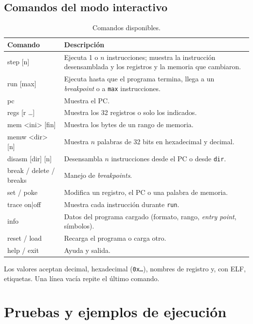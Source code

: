\documentclass[11pt,a4paper]{article}
\begin{document}
\subsection{Comandos del modo interactivo}

\begin{table}[h]
  \centering
  \caption{Comandos disponibles.}
  \small
  \begin{tabularx}{\textwidth}{>{\ttfamily}l X}
    \toprule
    \textbf{Comando} & \textbf{Descripción} \\
    \midrule
    step [n] & Ejecuta 1 o $n$ instrucciones; muestra la instrucción desensamblada y los
      registros y la memoria que cambiaron. \\
    run [max] & Ejecuta hasta que el programa termina, llega a un \textit{breakpoint} o
      a \texttt{max} instrucciones. \\
    pc & Muestra el PC. \\
    regs [r \ldots] & Muestra los 32 registros o solo los indicados. \\
    mem <ini> [fin] & Muestra los bytes de un rango de memoria. \\
    memw <dir> [n] & Muestra $n$ palabras de 32 bits en hexadecimal y decimal. \\
    disasm [dir] [n] & Desensambla $n$ instrucciones desde el PC o desde \texttt{dir}. \\
    break / delete / breaks & Manejo de \textit{breakpoints}. \\
    set / poke & Modifica un registro, el PC o una palabra de memoria. \\
    trace on|off & Muestra cada instrucción durante \texttt{run}. \\
    info & Datos del programa cargado (formato, rango, \textit{entry point}, símbolos). \\
    reset / load & Recarga el programa o carga otro. \\
    help / exit & Ayuda y salida. \\
    \bottomrule
  \end{tabularx}
\end{table}

Los valores aceptan decimal, hexadecimal (\texttt{0x\ldots}), nombres de registro y, con
ELF, etiquetas. Una línea vacía repite el último comando.

\section{Pruebas y ejemplos de ejecución}
\end{document}
